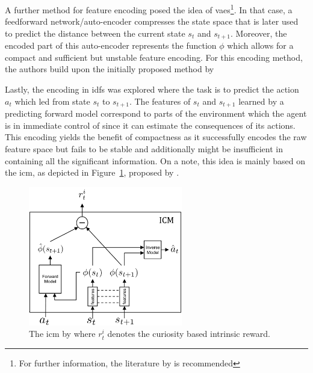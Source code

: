 \documentclass[draft,final]{vutinfth} %
\newcommand{\p}[1]{see p. #1}
\begin{document}
    A further method for feature encoding posed the idea of \glspl{vae}\footnote{For further information, the literature by \citet[\p{207-214}]{aggarwal_neural_2018} is recommended}.
    In that case, a feedforward network/auto-encoder compresses the state space that is later used to predict the distance between the current state $s_t$ and $s_{t+1}$.
    Moreover, the encoded part of this auto-encoder represents the function $\phi$ which allows for a compact and sufficient but unstable feature encoding.
    For this encoding method, the authors build upon the initially proposed method by~\citeauthor{stadie_incentivizing_2015}

    Lastly, the encoding in \glspl{idf} was explored where the task is to predict the action $a_t$ which led from state $s_t$ to $s_{t+1}$.
    The features of $s_t$ and $s_{t+1}$ learned by a predicting forward model correspond to parts of the environment which the agent is in immediate control of since it can estimate the consequences of its actions.
    This encoding yields the benefit of compactness as it successfully encodes the raw feature space but fails to be stable and additionally might be insufficient in containing all the significant information.
    On a note, this idea is mainly based on the \gls{icm}, as depicted in Figure~\ref{fig:icm}, proposed by \citet{pathak_curiosity-driven_2017-1}.

    \begin{figure}[h]
        \centering
        \includegraphics[width=0.6\textwidth]{figures/icm.png}
        \caption[The \acrlong{icm} introduced in ""]{The \gls{icm} by \citet{pathak_curiosity-driven_2017-1} where $r_t^i$ denotes the curiosity based intrinsic reward.\protect\footnotemark}
        \label{fig:icm}
    \end{figure}
\end{document}
